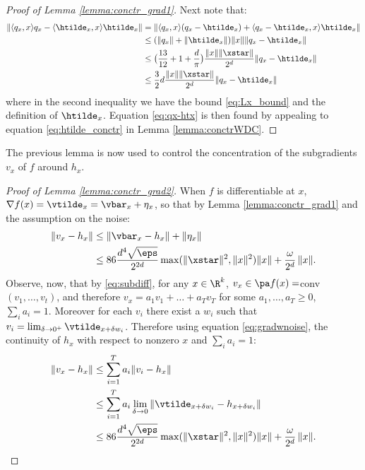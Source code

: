 \begin{proof}[Proof of Lemma \ref{lemma:conctr_grad1}]
		Next note that:
		\[
			\begin{aligned}
			\| \langle q_x, x \rangle q_x - \langle \htilde_x, x\rangle \htilde_x \| &= \| \langle q_x ,x \rangle  (q_x - \htilde_x) +  \langle q_x - \htilde_x , x \rangle \htilde_x \| \\				
			&\leq  ( \|q_x\| + \|\htilde_x\| ) \| x\| \|q_x - \htilde_x\| \\
			& \leq \big(\frac{13}{12} + 1 + \frac{d}{\pi}\big)  \frac{\|x\| \| \xstar\|}{2^d} \|q_x - \htilde_x\|\\
			&\leq \frac{3}{2} d \frac{\|x\| \| \xstar\|}{2^d} \|q_x - \htilde_x\|
			\end{aligned}
		\]
		where in the second inequality we have the bound
		\eqref{eq:Lx_bound} and the definition of $\htilde_{x}$. Equation \eqref{eq:qx-htx} is then 
		found by appealing to equation \eqref{eq:htilde_conctr} in Lemma \ref{lemma:conctrWDC}.
\end{proof}

The previous lemma is now used to control the concentration 
of the subgradients $v_x$ of $f$ around $h_x$.

\begin{proof}[Proof of Lemma \ref{lemma:conctr_grad2}]
	
	When $f$ is differentiable at $x$, $\nabla f(x) = \vtilde_x = \vbar_x + \eta_x$, so that by
	Lemma \ref{lemma:conctr_grad1} and the assumption on the noise:
	\begin{equation}\label{eq:gradwnoise}
	\begin{aligned}
		\| v_x - h_x \| &\leq \| \vbar_x
		- h_x\| + \|\eta_x\| \\
		&\leq 86 \frac{ d^4 \sqrt{\eps}}{2^{2d}} \max(\|\xstar\|^2, \| x\|^2) \|x\| +   \frac{\omega}{2^{d}} \,  \| x\|.
	\end{aligned}
	\end{equation}
	Observe, now, that by \eqref{eq:subdiff}, for any $x \in \R^k$,  $v_x \in \pa f(x) = $conv$(v_1, \dots, v_t)$, and therefore $v_x = a_1 v_1 + \dots + a_T v_T$ for some $a_1, \dots, a_T  \geq 0$, $\sum_i a_i = 1$.
	Moreover for each $v_i$ there exist a $w_i$ such that $v_i = \lim_{\delta \to 0^+} \vtilde_{x + \delta w_i} $. Therefore using equation \eqref{eq:gradwnoise}, the continuity of $h_x$ with respect to nonzero $x$ and $\sum_i a_i = 1$:
	\[
	\begin{aligned}
	\| v_x - h_x \| &\leq \sum_{i=1}^T a_i \| v_i  - h_x\| \\
	& \leq  \sum_{i=1}^T a_i \lim_{\delta \to 0} \|   \vtilde_{x + \delta w_i}  - h_{x + \delta w_i}\| \\
	&\leq 86 \frac{ d^4 \sqrt{\eps}}{2^{2d}} \max(\|\xstar\|^2, \| x\|^2) \|x\| + \frac{\omega}{2^{d}}  \,  \| x\|.
	\end{aligned}
	\]
\end{proof}

